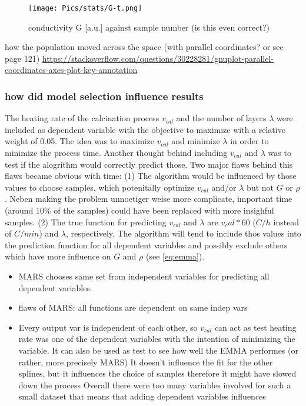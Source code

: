 \begin{figure}
    \centering
    \texttt{[image: Pics/stats/G-t.png]}
    \caption{conductivity G [a.u.] against sample number (is this even correct?)}
    \label{fig:G-t}
\end{figure}

     how the population moved across the space (with parallel coordinates? or see page 121)
        \url{https://stackoverflow.com/questions/30228281/gnuplot-parallel-coordinates-axes-plot-key-annotation}

\subsubsection{how did model selection influence results}
The heating rate of the calcination process $v_{cal}$ and the number of layers $\lambda$ were included as dependent variable with the objective to maximize with a relative weight of 0.05.
The idea was to maximize $v_{cal}$ and minimize $\lambda$ in order to minimize the process time. 
Another thought behind including $v_{cal}$ and $\lambda$ was to test if the alogrithm would correctly predict those. 
Two major flaws behind this flaws became obvious with time: 
(1) The algorithm would be influenced by those values to choose samples, which potenitally optimize $v_{cal}$ and/or $\lambda$ but not $G$ or $\rho$. 
Neben making the problem unnoetiger weise more complicate, important time (around 10\% of the samples) could have been replaced with more insighful samples. 
(2) The true function for predicting $v_{cal}$ and $\lambda$ are $v_cal*60$ ($C/h$ instead of $C/min$) and $\lambda$, respectively. 
The algorithm will tend to include thos values into the prediction function for all dependent variables and possibly exclude others which have more influence on $G$ and $\rho$ (see \ref{eq:emma}).
\begin{itemize}
    \item MARS chooses same set from independent variables for predicting all dependent variables. 
    \item flaws of MARS: all functions are dependent on same indep vars
    \item Every output var is independent of each other, so $v_{cal}$ can act as test 
heating rate was one of the dependent variables with the intention of minimizing the variable. 
It can also be used as test to see how well the EMMA performes (or rather, more precisely MARS)
It doesn't influence the fit for the other splines, but it influences the choice of samples therefore it might have slowed down the process
Overall there were too many variables involved for such a small dataset
        that means that adding dependent variables influences 
\end{itemize}

